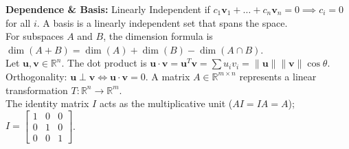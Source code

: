 \documentclass[10pt, landscape, twocolumn]{article}
\begin{document}
\textbf{Dependence \& Basis:} Linearly Independent if $c_1\mathbf{v}_1 + \dots + c_n\mathbf{v}_n = 0 \implies c_i = 0$ for all $i$. A basis is a linearly independent set that spans the space. \\For subspaces $A$ and $B$, the dimension formula is $\dim(A+B) = \dim(A) + \dim(B) - \dim(A \cap B)$.\\
Let $\mathbf{u}, \mathbf{v} \in \mathbb{R}^n$. The dot product is $\mathbf{u} \cdot \mathbf{v} = \mathbf{u}^T \mathbf{v} = \sum u_i v_i = \|\mathbf{u}\|\|\mathbf{v}\|\cos\theta$.\\
Orthogonality: $\mathbf{u} \perp \mathbf{v} \iff \mathbf{u} \cdot \mathbf{v} = 0$.
A matrix $A \in \mathbb{R}^{m \times n}$ represents a linear transformation $T: \mathbb{R}^n \to \mathbb{R}^m$. \\
The identity matrix $I$ acts as the multiplicative unit ($AI = IA = A$); $I = \left[ \begin{smallmatrix} 1 & 0 & 0 \\ 0 & 1 & 0 \\ 0 & 0 & 1 \end{smallmatrix} \right]$.
\end{document}
